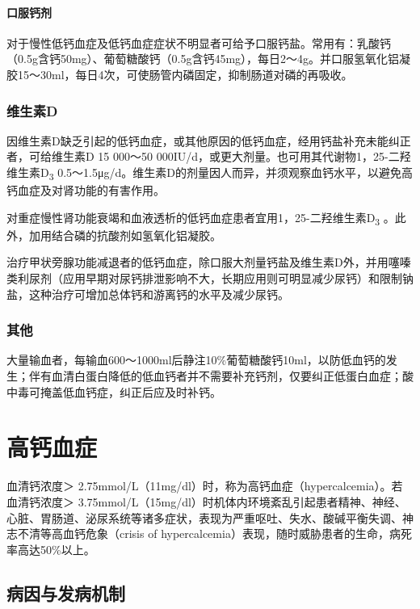 \paragraph{口服钙剂}

对于慢性低钙血症及低钙血症症状不明显者可给予口服钙盐。常用有：乳酸钙（0.5g含钙50mg）、葡萄糖酸钙（0.5g含钙45mg），每日2～4g。并口服氢氧化铝凝胶15～30ml，每日4次，可使肠管内磷固定，抑制肠道对磷的再吸收。

\subsubsection{维生素D}

因维生素D缺乏引起的低钙血症，或其他原因的低钙血症，经用钙盐补充未能纠正者，可给维生素D
15 000～50
000IU/d，或更大剂量。也可用其代谢物1，25-二羟维生素D\textsubscript{3}
0.5～1.5μg/d。维生素D的剂量因人而异，并须观察血钙水平，以避免高钙血症及对肾功能的有害作用。

对重症慢性肾功能衰竭和血液透析的低钙血症患者宜用1，25-二羟维生素D\textsubscript{3}
。此外，加用结合磷的抗酸剂如氢氧化铝凝胶。

治疗甲状旁腺功能减退者的低钙血症，除口服大剂量钙盐及维生素D外，并用噻嗪类利尿剂（应用早期对尿钙排泄影响不大，长期应用则可明显减少尿钙）和限制钠盐，这种治疗可增加总体钙和游离钙的水平及减少尿钙。

\subsubsection{其他}

大量输血者，每输血600～1000ml后静注10\%葡萄糖酸钙10ml，以防低血钙的发生；伴有血清白蛋白降低的低血钙者并不需要补充钙剂，仅要纠正低蛋白血症；酸中毒可掩盖低血钙症，纠正后应及时补钙。

\protect\hypertarget{text00200.html}{}{}

\section{高钙血症}

血清钙浓度＞
2.75mmol/L（11mg/dl）时，称为高钙血症（hypercalcemia）。若血清钙浓度＞
3.75mmol/L（15mg/dl）时机体内环境紊乱引起患者精神、神经、心脏、胃肠道、泌尿系统等诸多症状，表现为严重呕吐、失水、酸碱平衡失调、神志不清等高血钙危象（crisis
of hypercalcemia）表现，随时威胁患者的生命，病死率高达50\%以上。

\subsection{病因与发病机制}

